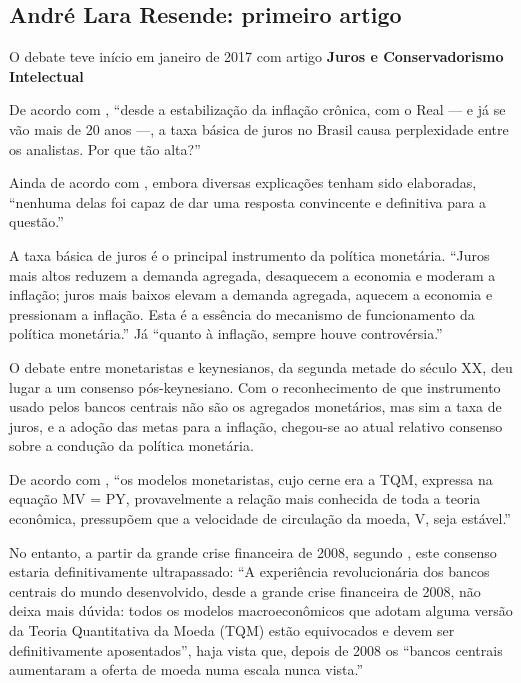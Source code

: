 \documentclass[
	10pt,				%
	openright,			%
	twoside,			%
	a5paper,			%
	english,			%
	french,				%
	spanish,			%
	brazil				%
	]{abntex2}
\renewenvironment{quote}
  {\small\list{}{\rightmargin=0.1cm \leftmargin=4cm}%
   \item\relax}
  {\endlist}
\begin{document}
\subsection{André Lara Resende: primeiro
artigo}\label{andruxe9-lara-resende-primeiro-artigo}

O debate teve início em janeiro de 2017 com artigo \textbf{Juros e
Conservadorismo Intelectual} \cite{resende1}

De acordo com , ``desde a estabilização da
inflação crônica, com o Real --- e já se vão mais de 20 anos ---, a taxa
básica de juros no Brasil causa perplexidade entre os analistas. Por que
tão alta?''

Ainda de acordo com , embora diversas
explicações tenham sido elaboradas, ``nenhuma delas foi capaz de dar uma
resposta convincente e definitiva para a questão.''

A taxa básica de juros é o principal instrumento da política monetária.
``Juros mais altos reduzem a demanda agregada, desaquecem a economia e
moderam a inflação; juros mais baixos elevam a demanda agregada, aquecem
a economia e pressionam a inflação. Esta é a essência do mecanismo de
funcionamento da política monetária.'' Já ``quanto à inflação, sempre
houve controvérsia.''

\begin{quote}
O debate entre monetaristas e keynesianos, da segunda metade do século
XX, deu lugar a um consenso pós-keynesiano. Com o reconhecimento de que
instrumento usado pelos bancos centrais não são os agregados monetários,
mas sim a taxa de juros, e a adoção das metas para a inflação, chegou-se
ao atual relativo consenso sobre a condução da política monetária.
\end{quote}

De acordo com , ``os modelos monetaristas,
cujo cerne era a TQM, expressa na equação MV = PY, provavelmente a
relação mais conhecida de toda a teoria econômica, pressupõem que a
velocidade de circulação da moeda, V, seja estável.''

No entanto, a partir da grande crise financeira de 2008, segundo
, este consenso estaria definitivamente
ultrapassado: ``A experiência revolucionária dos bancos centrais do
mundo desenvolvido, desde a grande crise financeira de 2008, não deixa
mais dúvida: todos os modelos macroeconômicos que adotam alguma versão
da Teoria Quantitativa da Moeda (TQM) estão equivocados e devem ser
definitivamente aposentados'', haja vista que, depois de 2008 os
``bancos centrais aumentaram a oferta de moeda numa escala nunca
vista.''
\end{document}
